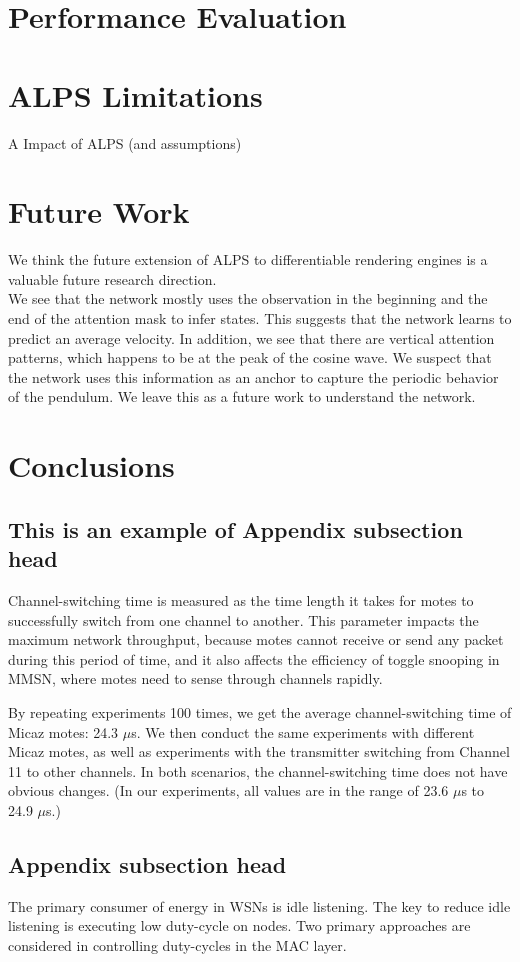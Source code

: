 \documentclass[acmtog]{techreportacmart}
\begin{document}
\section{Performance Evaluation}
\section{ALPS Limitations}
A Impact of ALPS (and assumptions)
\section{Future Work}
We think the future extension
of ALPS to differentiable rendering engines is a valuable future research direction.
\\
We see that the network mostly uses the observation in the beginning and the end of the attention
mask to infer states. This suggests that the network learns to predict an average velocity. In addition,
we see that there are vertical attention patterns, which happens to be at the peak of the cosine wave.
We suspect that the network uses this information as an anchor to capture the periodic behavior of the
pendulum. We leave this as a future work to understand the network.
\section{Conclusions}

\begin{screenonly}
\subsection{This is an example of Appendix subsection head}

Channel-switching time is measured as the time length it takes for
motes to successfully switch from one channel to another. This
parameter impacts the maximum network throughput, because motes
cannot receive or send any packet during this period of time, and it
also affects the efficiency of toggle snooping in MMSN, where motes
need to sense through channels rapidly.

By repeating experiments 100 times, we get the average
channel-switching time of Micaz motes: 24.3 $\mu$s. We then conduct
the same experiments with different Micaz motes, as well as
experiments with the transmitter switching from Channel 11 to other
channels. In both scenarios, the channel-switching time does not have
obvious changes. (In our experiments, all values are in the range of
23.6 $\mu$s to 24.9 $\mu$s.)

\subsection{Appendix subsection head}

The primary consumer of energy in WSNs is idle listening. The key to
reduce idle listening is executing low duty-cycle on nodes. Two
primary approaches are considered in controlling duty-cycles in the
MAC layer.
  
\end{screenonly}



\end{document}
